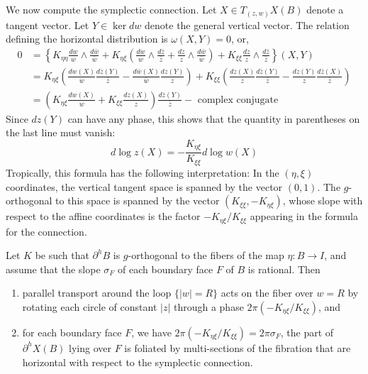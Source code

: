 \documentclass[12pt]{amsart}
\begin{document}
We now compute the symplectic connection. Let $X \in T_{(z,w)}X(B)$
denote a tangent vector. Let $Y \in \ker dw$ denote the general
vertical vector. The relation defining the horizontal distribution is
$\omega(X,Y) = 0$, or,
\begin{equation}
\begin{split}
 0 &=  \left\{K_{\eta\eta}\frac{dw}{w} \wedge \frac{d\bar{w}}{\bar{w}} + K_{\eta\xi}\left(\frac{dw}{w}
 \wedge \frac{d\bar{z}}{\bar{z}} + \frac{dz}{z} \wedge \frac{d\bar{w}}{\bar{w}}\right) + K_{\xi\xi}
   \frac{dz}{z} \wedge \frac{d\bar{z}}{\bar{z}}\right\}(X,Y)\\
&= K_{\eta\xi}\left(\frac{dw(X)}{w}\frac{d\bar{z}(Y)}{\bar{z}} -
  \frac{d\bar{w}(X)}{\bar{w}}\frac{dz(Y)}{z}\right) +
K_{\xi\xi}\left(\frac{dz(X)}{z}\frac{d\bar{z}(Y)}{\bar{z}}-
  \frac{dz(Y)}{z}\frac{d\bar{z}(X)}{\bar{z}}\right)\\
&= \left(K_{\eta\xi}\frac{dw(X)}{w} + K_{\xi\xi}
  \frac{dz(X)}{z}\right)\frac{d\bar{z}(Y)}{\bar{z}} - \text{ complex conjugate}
\end{split}
\end{equation}
Since $dz(Y)$ can have any phase, this shows that the quantity in
parentheses on the last line must vanish:
\begin{equation}
  \label{eq:symplectic-connection}
  d\log z (X) = -\frac{K_{\eta\xi}}{K_{\xi\xi}}d\log w (X)
\end{equation}
Tropically, this formula has the following interpretation: In the
$(\eta,\xi)$ coordinates, the vertical tangent space is spanned by the
vector $(0,1)$. The $g$-orthogonal to this space is spanned by the
vector $(K_{\xi\xi}, -K_{\eta\xi})$, whose slope with respect to the
affine coordinates is the factor $-K_{\eta\xi}/K_{\xi\xi}$ appearing in the
formula for the connection.

\begin{lemma}
  \label{lem:monodromy-hessian}
   Let $K$ be such that  $\partial^h B$ is $g$-orthogonal to the fibers of the map $\eta: B\to I$, and assume that the slope $\sigma_F$ of each boundary face $F$ of $B$ is rational. Then 
   \begin{enumerate}
   \item parallel transport around the loop $\{|w|= R\}$ acts on the fiber over $w = R$ by rotating each circle of constant $|z|$ through a phase $2\pi (-K_{\eta\xi}/K_{\xi\xi})$, and 
   \item for each boundary face $F$, we have $2\pi(-K_{\eta\xi}/K_{\xi\xi}) = 2\pi\sigma_F$, the part of $\partial^h X(B)$ lying over $F$ is foliated by multi-sections of the fibration that are horizontal with respect to the symplectic connection.
   \end{enumerate}
\end{lemma}
\end{document}
